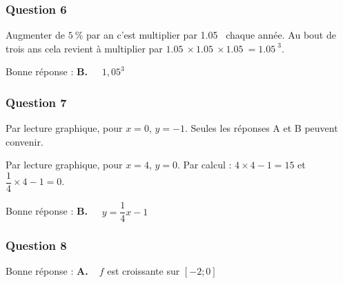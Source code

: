 \documentclass[10pt]{article}
\providecommand{\np}[2][]{{#2~#1}}
\begin{document}
\subsubsection*{Question 6}
Augmenter de $5~\%$ par an c'est multiplier par \np{1.05} chaque année. Au bout de trois ans cela revient à multiplier par $\np{1.05}\times\np{1.05}\times\np{1.05} = \np{1.05}^3$.

Bonne réponse : \textbf{B.~~} $1,05^{3}$


\subsubsection*{Question 7}
Par lecture graphique, pour $x = 0$, $y = -1$. Seules les réponses A et B peuvent convenir.

Par lecture graphique, pour $x = 4$, $y = 0$. Par calcul : $4\times 4 - 1 = 15$  et $\dfrac{1}{4}\times 4 - 1 = 0$.

Bonne réponse : \textbf{B.~~} $y=\dfrac{1}{4} x - 1$


\subsubsection*{Question 8}
Bonne réponse : \textbf{A.~~}$f$ est croissante sur $[-2 ; 0]$
\end{document}
